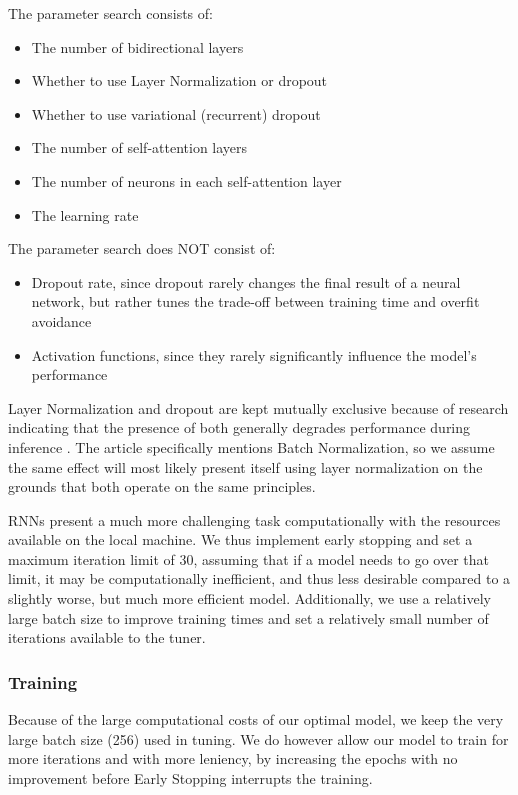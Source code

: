 \documentclass[10pt, a4paper]{article}
\begin{document}
	The parameter search consists of:
	\begin{itemize}
		\item The number of bidirectional layers
		\item Whether to use Layer Normalization or dropout
		\item Whether to use variational (recurrent) dropout
		\item The number of self-attention layers
		\item The number of neurons in each self-attention layer
		\item The learning rate
	\end{itemize}
	
	
	The parameter search does NOT consist of:
	\begin{itemize}
		\item Dropout rate, since dropout rarely changes the final result of a neural network, but rather tunes the trade-off between training time and overfit avoidance
		\item Activation functions, since they rarely significantly influence the model's performance
	\end{itemize}

	Layer Normalization and dropout are kept mutually exclusive because of research indicating that the presence of both generally degrades performance during inference \cite{dropout-norm}. The article specifically mentions Batch Normalization, so we assume the same effect will most likely present itself using layer normalization on the grounds that both operate on the same principles.
	
	RNNs present a much more challenging task computationally with the resources available on the local machine. We thus implement early stopping and set a maximum iteration limit of $30$, assuming that if a model needs to go over that limit, it may be computationally inefficient, and thus less desirable compared to a slightly worse, but much more efficient model. Additionally, we use a relatively large batch size to improve training times and set a relatively small number of iterations available to the tuner.
	
	
	\subsubsection{Training}
	
	Because of the large computational costs of our optimal model, we keep the very large batch size (256) used in tuning. We do however allow our model to train for more iterations and with more leniency, by increasing the epochs with no improvement before Early Stopping interrupts the training.
	
\end{document}
